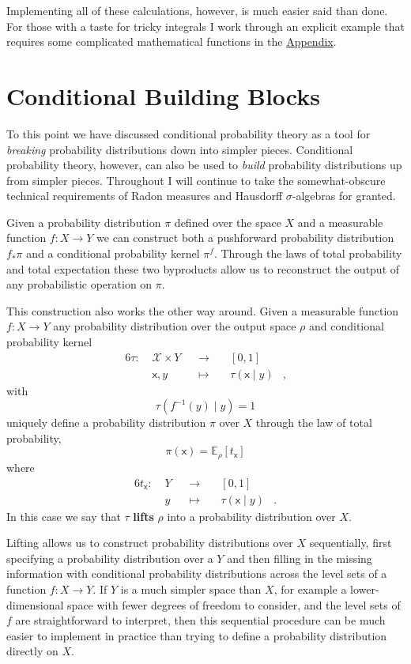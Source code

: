 \documentclass[
  letterpaper,
  DIV=11,
  numbers=noendperiod]{scrartcl}
\begin{document}
Implementing all of these calculations, however, is much easier said
than done. For those with a taste for tricky integrals I work through an
explicit example that requires some complicated mathematical functions
in the \href{@sec:appendix}{Appendix}.

\section{Conditional Building Blocks}\label{conditional-building-blocks}

To this point we have discussed conditional probability theory as a tool
for \emph{breaking} probability distributions down into simpler pieces.
Conditional probability theory, however, can also be used to
\emph{build} probability distributions up from simpler pieces.
Throughout I will continue to take the somewhat-obscure technical
requirements of Radon measures and Hausdorff \(\sigma\)-algebras for
granted.

Given a probability distribution \(\pi\) defined over the space \(X\)
and a measurable function \(f : X \rightarrow Y\) we can construct both
a pushforward probability distribution \(f_{*} \pi\) and a conditional
probability kernel \(\pi^{f}\). Through the laws of total probability
and total expectation these two byproducts allow us to reconstruct the
output of any probabilistic operation on \(\pi\).

This construction also works the other way around. Given a measurable
function \(f: X \rightarrow Y\) any probability distribution over the
output space \(\rho\) and conditional probability kernel
\begin{alignat*}{6}
\tau :\; &\mathcal{X} \times Y& &\rightarrow& \; &[0, 1]&
\\
&\mathsf{x}, y& &\mapsto& &\tau ( \mathsf{x} \mid y )&,
\end{alignat*} with \[
\tau ( f^{-1}(y) \mid y ) = 1
\] uniquely define a probability distribution \(\pi\) over \(X\) through
the law of total probability, \[
\pi( \mathsf{x} ) = \mathbb{E}_{\rho} [ t_{\mathsf{x}} ]
\] where \begin{alignat*}{6}
t_{\mathsf{x}} :\; &Y& &\rightarrow& \; &[0, 1]&
\\
&y& &\mapsto& &\tau ( \mathsf{x} \mid y )&.
\end{alignat*} In this case we say that \(\tau\) \textbf{lifts} \(\rho\)
into a probability distribution over \(X\).

Lifting allows us to construct probability distributions over \(X\)
sequentially, first specifying a probability distribution over a \(Y\)
and then filling in the missing information with conditional probability
distributions across the level sets of a function
\(f : X \rightarrow Y\). If \(Y\) is a much simpler space than \(X\),
for example a lower-dimensional space with fewer degrees of freedom to
consider, and the level sets of \(f\) are straightforward to interpret,
then this sequential procedure can be much easier to implement in
practice than trying to define a probability distribution directly on
\(X\).
\end{document}
